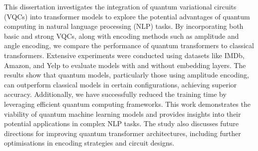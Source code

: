 This dissertation investigates the integration of quantum variational
circuits (VQCs) into transformer models to explore the potential
advantages of quantum computing in natural language processing (NLP)
tasks. By incorporating both basic and strong VQCs, along with
encoding methods such as amplitude and angle encoding, we compare the
performance of quantum transformers to classical transformers.
Extensive experiments were conducted using datasets like IMDb,
Amazon, and Yelp to evaluate models with and without embedding
layers. The results show that quantum models, particularly those
using amplitude encoding, can outperform classical models in certain
configurations, achieving superior accuracy. Additionally, we have
successfully reduced the training time by leveraging efficient
quantum computing frameworks. This work
demonstrates the viability of quantum machine learning
models and provides insights into their potential applications in
complex NLP tasks. The study also discusses future directions for
improving quantum transformer architectures, including further
optimisations in encoding strategies and circuit designs.
